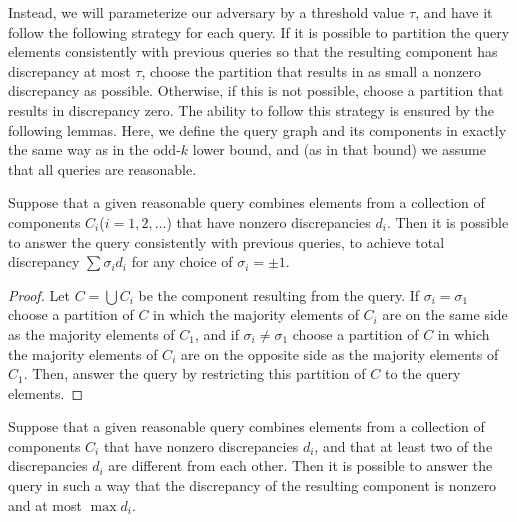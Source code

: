 \documentclass[11pt]{llncs}
\newcommand{\threshold}{\tau}
\begin{document}
Instead, we will parameterize our adversary by a threshold value $\threshold$, and have it follow the following strategy for each query. If it is possible to partition the query elements consistently with previous queries so that the resulting component has discrepancy at most $\threshold$, choose the partition that results in as small a nonzero discrepancy as possible. Otherwise, if this is not possible, choose a partition that results in discrepancy zero. The ability to follow this strategy is ensured by the following lemmas. Here, we define the query graph and its components in exactly the same way as in the odd-$k$ lower bound, and (as in that bound) we assume that all queries are reasonable.

\begin{lemma}
Suppose that a given reasonable query combines elements from a collection of components $C_i$($i=1,2,\dots$) that have nonzero discrepancies $d_i$. Then it is possible to answer the query consistently with previous queries, to achieve total discrepancy $\sum \sigma_i d_i$ for any choice of $\sigma_i=\pm 1$.
\end{lemma}

\begin{proof}
Let $C=\bigcup C_i$ be the component resulting from the query.
If $\sigma_i=\sigma_1$ choose a partition of $C$ in which the majority elements of $C_i$ are on the same side as the majority elements of $C_1$, and if $\sigma_i\ne\sigma_1$ choose a partition of $C$ in which the majority elements of $C_i$ are on the opposite side as the majority elements of $C_1$. Then, answer the query by restricting this partition of $C$ to the query elements.
\end{proof}

\begin{lemma}
Suppose that a given reasonable query combines elements from a collection of components $C_i$ that have nonzero discrepancies $d_i$, and that at least two of the discrepancies $d_i$ are different from each other. Then it is possible to answer the query in such a way that the discrepancy of the resulting component is nonzero and at most $\max d_i$.
\end{lemma}
\end{document}
